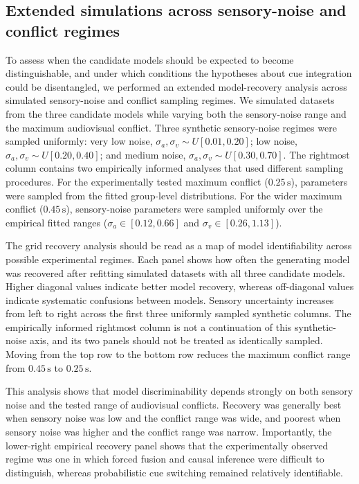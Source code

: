\documentclass{jov}
\begin{document}

\subsection{Extended simulations across sensory-noise and conflict regimes}

To assess when the candidate models should be expected to become distinguishable, and under which conditions the hypotheses about cue integration could be disentangled, we performed an extended model-recovery analysis across simulated sensory-noise and conflict sampling regimes. We simulated datasets from the three candidate models while varying both the sensory-noise range and the maximum audiovisual conflict. Three synthetic sensory-noise regimes were sampled uniformly: very low noise, $\sigma_a,\sigma_v \sim U[0.01,0.20]$; low noise, $\sigma_a,\sigma_v \sim U[0.20,0.40]$; and medium noise, $\sigma_a,\sigma_v \sim U[0.30,0.70]$. The rightmost column contains two empirically informed analyses that used different sampling procedures. For the experimentally tested maximum conflict ($0.25\,\mathrm{s}$), parameters were sampled from the fitted group-level distributions. For the wider maximum conflict ($0.45\,\mathrm{s}$), sensory-noise parameters were sampled uniformly over the empirical fitted ranges ($\sigma_a \in [0.12,0.66]$ and $\sigma_v \in [0.26,1.13]$).

The grid recovery analysis should be read as a map of model identifiability across possible experimental regimes. Each panel shows how often the generating model was recovered after refitting simulated datasets with all three candidate models. Higher diagonal values indicate better model recovery, whereas off-diagonal values indicate systematic confusions between models. Sensory uncertainty increases from left to right across the first three uniformly sampled synthetic columns. The empirically informed rightmost column is not a continuation of this synthetic-noise axis, and its two panels should not be treated as identically sampled. Moving from the top row to the bottom row reduces the maximum conflict range from $0.45\,\mathrm{s}$ to $0.25\,\mathrm{s}$.

This analysis shows that model discriminability depends strongly on both sensory noise and the tested range of audiovisual conflicts. Recovery was generally best when sensory noise was low and the conflict range was wide, and poorest when sensory noise was higher and the conflict range was narrow. Importantly, the lower-right empirical recovery panel shows that the experimentally observed regime was one in which forced fusion and causal inference were difficult to distinguish, whereas probabilistic cue switching remained relatively identifiable.
\end{document}
